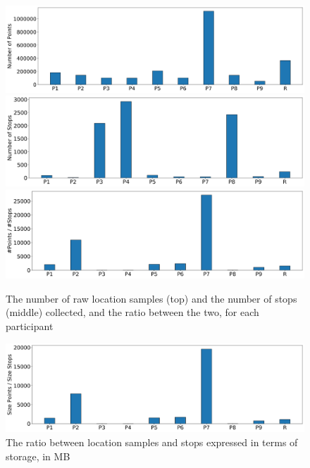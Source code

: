 \begin{figure}
    \centering
    \includegraphics[width=\textwidth]{images/study/storage/num_points.png}
    \includegraphics[width=\textwidth]{images/study/storage/num_stops.png}
    \includegraphics[width=\textwidth]{images/study/storage/compression_N.png}
    \caption{The number of raw location samples (top) and the number of stops (middle) collected, and the ratio between the two, for each participant}
    \label{fig:plot-num-points-stops}
\end{figure}

\begin{figure}
    \centering
    \includegraphics[width=\textwidth]{images/study/storage/compression_mb.png}
    \caption{The ratio between location samples and stops expressed in terms of storage, in MB}
    \label{fig:plot-num-points-stops}
\end{figure}

